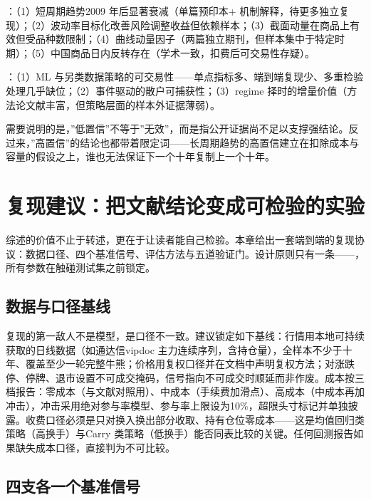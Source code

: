 \documentclass[12pt,a4paper]{ctexart}
\begin{document}
：（1）短周期趋势2009 年后显著衰减（单篇预印本+ 机制解释，待更多独立复现）\cite{11}；（2）波动率目标化改善风险调整收益但依赖样本\cite{08, 09}；（3）截面动量在商品上有效但受品种数限制\cite{61, 66}；（4）曲线动量因子\cite{55, 56}（两篇独立期刊，但样本集中于特定时期）；（5）中国商品日内反转存在\cite{42, 43}（学术一致，扣费后可交易性存疑\cite{77}）。


：（1）ML 与另类数据策略的可交易性\cite{78, 81, 82, 83}——单点指标多、端到端复现少、多重检验处理几乎缺位；（2）事件驱动的散户可捕获性\cite{73, 74}；（3）regime 择时的增量价值\cite{88, 89, 90}（方法论文献丰富，但策略层面的样本外证据薄弱）。


需要说明的是，”\hspace{0.3em}低置信”\hspace{0.3em}不等于”\hspace{0.3em}无效”，而是指公开证据尚不足以支撑强结论。反过来，”\hspace{0.3em}高置信”\hspace{0.3em}的结论也都带着限定词——长周期趋势的高置信建立在扣除成本与容量的假设之上，谁也无法保证下一个十年复制上一个十年。


\section{复现建议：把文献结论变成可检验的实验}

综述的价值不止于转述，更在于让读者能自己检验。本章给出一套端到端的复现协议：数据口径、四个基准信号、评估方法与五道验证门。设计原则只有一条——，所有参数在触碰测试集之前锁定。


\subsection{数据与口径基线}

复现的第一敌人不是模型，是口径不一致。建议锁定如下基线：行情用本地可持续获取的日线数据（如通达信vipdoc 主力连续序列，含持仓量），全样本不少于十年、覆盖至少一轮完整牛熊；价格用复权口径并在文档中声明复权方法；对涨跌停、停牌、退市设置不可成交掩码，信号指向不可成交时顺延而非作废。成本按三档报告：零成本（与文献对照用）、中成本（手续费加滑点）、高成本（中成本再加冲击），冲击采用绝对参与率模型、参与率上限设为10\%，超限头寸标记并单独披露。收费口径必须是只对换入换出部分收取、持有仓位零成本——这是均值回归类策略（高换手）与Carry 类策略（低换手）能否同表比较的关键。任何回测报告如果缺失成本口径，直接判为不可比较。


\subsection{四支各一个基准信号}
\end{document}
